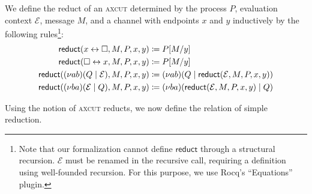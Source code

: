 \begin{definition} \label{def:axcut-reduct}
  We define the reduct of an \textsc{axcut} determined by the process $P$,
  evaluation context $\mathcal{E}$, message $M$, and a channel with endpoints $x$ and $y$
  inductively by the following rules\footnote{Note that our formalization cannot define $\mathsf{reduct}$ through
  a structural recursion. $\mathcal{E}$ must be renamed in the recursive
  call, requiring a definition using well-founded recursion. For this purpose,
  we use Rocq's \enquote{Equations} plugin.}:
  \begin{align*}
    \mathsf{reduct}(x \leftrightarrow \square, M, P, x, y) &\coloneq P[M/y] \\
    \mathsf{reduct}(\square \leftrightarrow x, M, P, x, y) &\coloneq P[M/y] \\
    \mathsf{reduct}((\nu a b)(Q \mid \mathcal{E}), M, P, x, y)
      &\coloneq (\nu a b)(Q \mid \mathsf{reduct}(\mathcal{E}, M, P, x, y)) \\
    \mathsf{reduct}((\nu b a)(\mathcal{E} \mid Q), M, P, x, y)
      &\coloneq (\nu b a)(\mathsf{reduct}(\mathcal{E}, M, P, x, y) \mid Q)
  \end{align*}
\end{definition}

Using the notion of \textsc{axcut} reducts, we now define the relation of
simple reduction.

